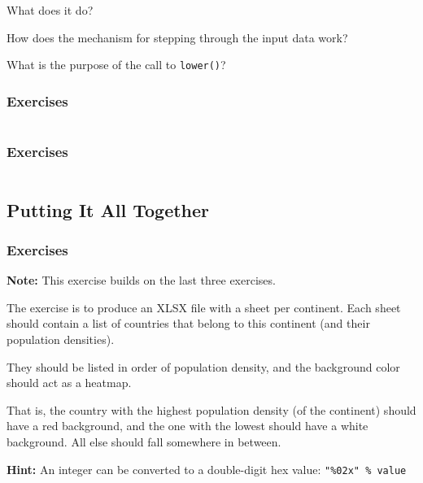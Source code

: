 {\begin{frame}[fragile]
  \vspace{5mm}
  What does it do?
  
  \vspace{5mm}
  How does the mechanism for stepping through the input data work?
  
  \vspace{5mm}
  What is the purpose of the call to \texttt{lower()}?
\end{frame}
\begin{frame}[fragile]
  \frametitle{Exercises }
  \vspace{0mm}
  \inputminted[fontsize=\scriptsize, lastline=22]{python}{../src/produce-country2continent-map.py}
\end{frame}
\begin{frame}[fragile]
  \frametitle{Exercises }
  \vspace{0mm}
  \inputminted[fontsize=\scriptsize, firstline=23]{python}{../src/produce-country2continent-map.py}
\end{frame}

\subsection{Putting It All Together}
\begin{frame}[fragile]
  \frametitle{Exercises }
  \vspace{3mm}
  \textbf{Note:} This exercise builds on the last three exercises.
  
  \vspace{5mm}
  The exercise is to produce an XLSX file with a sheet per continent. Each sheet should contain a list of countries that belong to this continent (and their population densities).
  
  \vspace{5mm}
  They should be listed in order of population density, and the background color should act as a heatmap.
  
  \vspace{5mm}
  That is, the country with the highest population density (of the continent) should have a red background, and the one with the lowest should have a white background. All else should fall somewhere in between.
  
  \vspace{5mm}
  \textbf{Hint:} An integer can be converted to a double-digit hex value: \texttt{"\%02x" \% value}
\end{frame}

}

